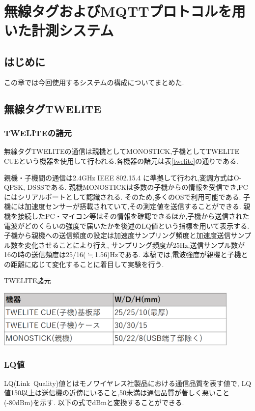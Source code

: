 \chapter{無線タグおよびMQTTプロトコルを用いた計測システム}

\section{はじめに}
この章では今回使用するシステムの構成についてまとめた.

\section{無線タグTWELITE}
\subsection{TWELITEの諸元}
無線タグTWELITEの通信は親機としてMONOSTICK,子機としてTWELITE CUEという機器を使用して行われる.各機器の諸元は表\ref{twelite}の通りである.

親機・子機間の通信は2.4GHz IEEE 802.15.4 に準拠して行われ,変調方式はO-QPSK, DSSSである.\cite{TWdatasheet}
親機MONOSTICKは多数の子機からの情報を受信でき,PCにはシリアルポートとして認識される.
そのため,多くのOSで利用可能である.
子機には加速度センサーが搭載されていて,その測定値を送信することができる.
親機を接続したPC・マイコン等はその情報を確認できるほか,子機から送信された電波がどのくらいの強度で届いたかを後述のLQ値という指標を用いて表示する.\cite{TW1}
子機から親機への送信頻度の設定は加速度サンプリング頻度と加速度送信サンプル数を変化させることにより行え,
サンプリング頻度が25Hz,送信サンプル数が16の時の送信頻度は25/16($\fallingdotseq$1.56)Hzである.
本稿では,電波強度が親機と子機との距離に応じて変化することに着目して実験を行う.

\begin{table}[htb]
 \centering
 \caption{TWELITE諸元}
  \includegraphics[width = 12cm, bb= 0 0 900 250]{chapter2/TWELITE.png}
   
  \label{twelite}
\end{table}


\subsection{LQ値}
LQ(Link\ Quality)値とはモノワイヤレス社製品における通信品質を表す値で,
LQ値150以上は送信機の近傍にいること,50未満は通信品質が著しく悪いこと(-80dBm)を示す.
以下の式でdBmと変換することができる.\cite{TWLQ}

